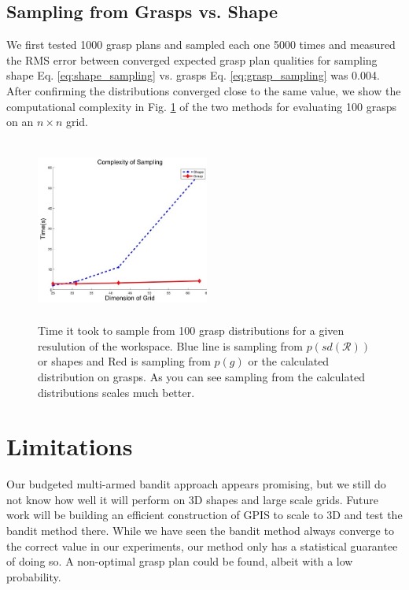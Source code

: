 \documentclass[letterpaper, 10 pt, conference]{ieeeconf}  %
\begin{document}
\subsection{Sampling from Grasps vs. Shape}
We first tested 1000 grasp plans and sampled each one 5000 times  and measured the RMS error between converged expected grasp plan qualities for sampling shape Eq. \ref{eq:shape_sampling} vs. grasps  Eq. \ref{eq:grasp_sampling} was 0.004. After confirming the distributions converged close to the same value, we show the computational complexity in Fig. \ref{fig:speed_dif} of the two methods for evaluating 100 grasps on an $n \times n$ grid. 



\begin{figure}[ht!]
\centering
\includegraphics[width=5.7cm,height=6cm]{figures/Slide12.jpg}
\caption{ \footnotesize Time it took to sample from 100 grasp distributions for a given resulution of the workspace. Blue line is sampling from $p(sd(\mathcal{R}))$ or shapes and Red is sampling from $p(g)$ or the calculated distribution on grasps. As you can see sampling from the calculated distributions scales much better. }
\vspace*{-10pt}
\label{fig:speed_dif}
\end{figure}

\section{Limitations} 

Our budgeted multi-armed bandit approach appears promising, but we still do not know how well it will perform on 3D shapes and large scale grids. Future work will be building an efficient construction of GPIS to scale to 3D and test the bandit method there. While we have seen the bandit method always converge to the correct value in our experiments, our method only has a statistical guarantee of doing so. A non-optimal grasp plan could be found, albeit with a low probability. 
\end{document}

